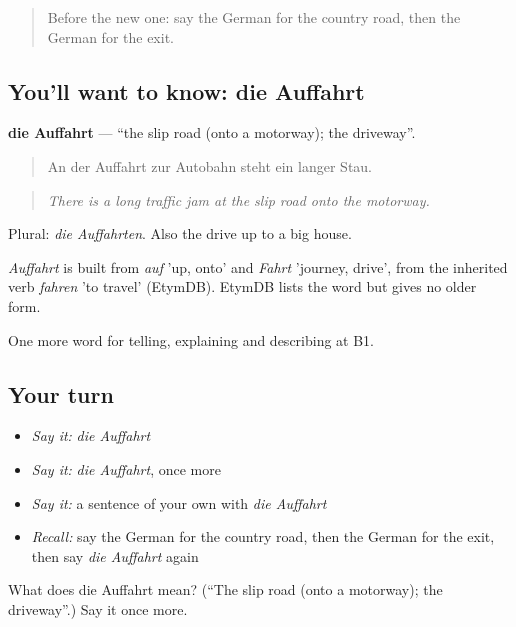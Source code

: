 \begin{quote}
Before the new one: say the German for the country road, then the German for the exit.
\end{quote}

\subsection*{You'll want to know: die Auffahrt}
\textbf{die Auffahrt} — \textquotedblleft{}the slip road (onto a motorway); the driveway\textquotedblright{}.

\begin{quote}
An der Auffahrt zur Autobahn steht ein langer Stau.
\end{quote}

\begin{quote}
\emph{There is a long traffic jam at the slip road onto the motorway.}
\end{quote}

Plural: \emph{die Auffahrten}. Also the drive up to a big house.

\begin{cousinweb}
\emph{Auffahrt} is built from \emph{auf} 'up, onto' and \emph{Fahrt} 'journey, drive', from the inherited verb \emph{fahren} 'to travel' (EtymDB). EtymDB lists the word but gives no older form.
\end{cousinweb}

\begin{grammarlens}[title={What you've built}]
One more word for telling, explaining and describing at B1.
\end{grammarlens}

\subsection*{Your turn}
\begin{itemize}
\raggedright
  \item \emph{Say it:} \emph{die Auffahrt}
  \item \emph{Say it:} \emph{die Auffahrt}, once more
  \item \emph{Say it:} a sentence of your own with \emph{die Auffahrt}
  \item \emph{Recall:} say the German for the country road, then the German for the exit, then say \emph{die Auffahrt} again
\end{itemize}

\begin{tcolorbox}[breakable,colback=teal!4,colframe=teal!35!black,title={Before you move on}]
What does die Auffahrt mean? (\textquotedblleft{}The slip road (onto a motorway); the driveway\textquotedblright{}.) Say it once more.
\end{tcolorbox}
